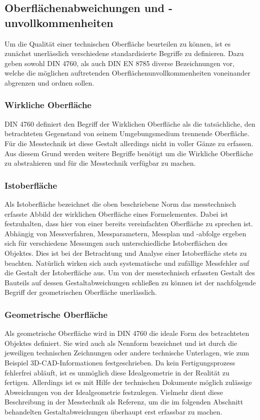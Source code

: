 \subsection{Oberflächenabweichungen und -unvollkommenheiten}

Um die Qualität einer technischen Oberfläche beurteilen zu können, ist es zunächst unerlässlich verschiedene standardisierte Begriffe zu definieren. Dazu geben sowohl DIN 4760, als auch DIN EN 8785 diverse Bezeichnungen vor, welche die möglichen auftretenden Oberflächenunvollkommenheiten voneinander abgrenzen und ordnen sollen.

\subsubsection{Wirkliche Oberfläche}

DIN 4760 definiert den Begriff der Wirklichen Oberfläche als die tatsächliche, den betrachteten Gegenstand von seinem Umgebungsmedium trennende Oberfläche. Für die Messtechnik ist diese Gestalt allerdings nicht in voller Gänze zu erfassen. Aus diesem Grund werden weitere Begriffe benötigt um die Wirkliche Oberfläche zu abstrahieren und für die Messtechnik verfügbar zu machen. 

\subsubsection{Istoberfläche}

Als Istoberfläche bezeichnet die oben beschriebene Norm das messtechnisch erfasste Abbild der wirklichen Oberfläche eines Formelementes. Dabei ist festzuhalten, dass hier von einer bereits vereinfachten Oberfläche zu sprechen ist. Abhängig von Messverfahren, Messparametern, Messplan und -abfolge ergeben sich für verschiedene Messungen auch unterschiedliche Ist\-oberflächen des Objektes. Dies ist bei der Betrachtung und Analyse einer Istoberfläche stets zu beachten. Natürlich wirken sich auch systematische und zufällige Messfehler auf die Gestalt der Istoberfläche aus. Um von der messtechnisch erfassten Gestalt des Bauteils auf dessen Gestaltabweichungen schließen zu können ist der nachfolgende Begriff der geometrischen Oberfläche unerlässlich. 

\subsubsection{Geometrische Oberfläche}

Als geometrische Oberfläche wird in DIN 4760 die ideale Form des betrachteten Objektes definiert. Sie wird auch als Nennform bezeichnet und ist durch die jeweiligen technischen Zeichnungen oder andere technische Unterlagen, wie zum Beispiel 3D-CAD-Informationen festgeschrieben. Da kein Fertigungsprozess fehlerfrei abläuft, ist es unmöglich diese Idealgeometrie in der Realität zu fertigen. Allerdings ist es mit Hilfe der technischen Dokumente möglich zulässige Abweichungen von der Idealgeometrie festzulegen. Vielmehr dient diese Beschreibung in der Messtechnik als Referenz, um die im folgenden Abschnitt behandelten Gestaltabweichungen überhaupt erst erfassbar zu machen.
     
